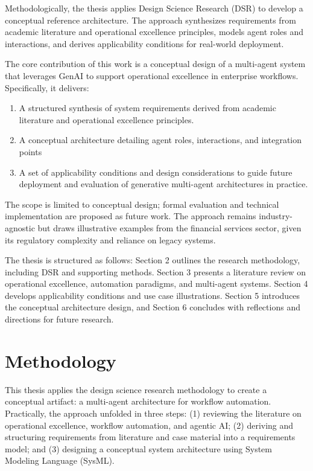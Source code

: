 Methodologically, the thesis applies Design Science Research (DSR) to develop a conceptual reference architecture. The approach synthesizes requirements from academic literature and operational excellence principles, models agent roles and interactions, and derives applicability conditions for real-world deployment.

The core contribution of this work is a conceptual design of a multi-agent system that leverages GenAI to support operational excellence in enterprise workflows. Specifically, it delivers:
\begin{enumerate}
    \item A structured synthesis of system requirements derived from academic literature and operational excellence principles.
    \item A conceptual architecture detailing agent roles, interactions, and integration points
    \item A set of applicability conditions and design considerations to guide future deployment and evaluation of generative multi-agent architectures in practice.
\end{enumerate}

The scope is limited to conceptual design; formal evaluation and technical implementation are proposed as future work. The approach remains industry-agnostic but draws illustrative examples from the financial services sector, given its regulatory complexity and reliance on legacy systems.

The thesis is structured as follows: Section 2 outlines the research methodology, including DSR and supporting methods. Section 3 presents a literature review on operational excellence, automation paradigms, and multi-agent systems. Section 4 develops applicability conditions and use case illustrations. Section 5 introduces the conceptual architecture design, and Section 6 concludes with reflections and directions for future research.

\section{Methodology}\label{sec:method}
This thesis applies the design science research methodology to create a conceptual artifact: a multi-agent architecture for workflow automation. Practically, the approach unfolded in three steps: (1) reviewing the literature on operational excellence, workflow automation, and agentic AI; (2) deriving and structuring requirements from literature and case material into a requirements model; and (3) designing a conceptual system architecture using System Modeling Language (SysML).

